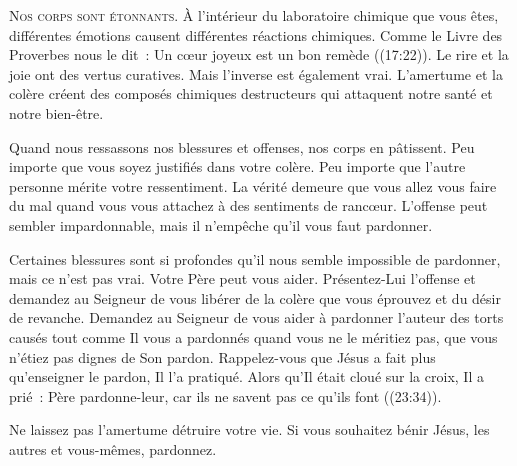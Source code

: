 




\lettrine{N}{os corps sont étonnants.} À l'intérieur du laboratoire
 chimique que vous êtes, différentes émotions causent différentes
 réactions chimiques. Comme le Livre des Proverbes nous le dit~: 
 \og Un cœur joyeux est un bon remède \fg{} ((17:22)).
 Le rire et la joie ont des vertus curatives.
 Mais l'inverse est également vrai. L'amertume et la colère
 créent des composés chimiques destructeurs qui attaquent
 notre santé et notre bien-être.


Quand nous ressassons nos blessures et offenses, nos corps en pâtissent.
 Peu importe que vous soyez justifiés dans votre colère.
 Peu importe que l'autre personne mérite votre ressentiment.
 La vérité demeure que vous allez vous faire du mal quand vous vous
 attachez à des sentiments de rancœur.
 L'offense peut sembler impardonnable,
 mais il n'empêche qu'il vous faut pardonner.

Certaines blessures sont si profondes qu'il nous semble impossible
 de pardonner, mais ce n'est pas vrai. Votre Père peut vous aider.
 Présentez-Lui  l'offense et demandez 
 au Seigneur de vous libérer de la colère que vous éprouvez
 et du désir de revanche. Demandez au Seigneur de vous aider à pardonner
 l'auteur des torts causés \ocadr tout comme Il vous a pardonnés
 quand vous ne le méritiez pas, que vous n'étiez pas dignes de Son pardon.
 Rappelez-vous que Jésus a fait plus qu'enseigner le pardon, Il l'a pratiqué.
 Alors qu'Il était cloué sur la croix, Il a prié~: 
 \og Père pardonne-leur, car ils ne savent pas ce qu'ils font \fg{}
 ((23:34)).

Ne laissez pas l'amertume détruire votre vie.
 Si vous souhaitez bénir Jésus, les autres et vous-mêmes, pardonnez.

\dvrule

